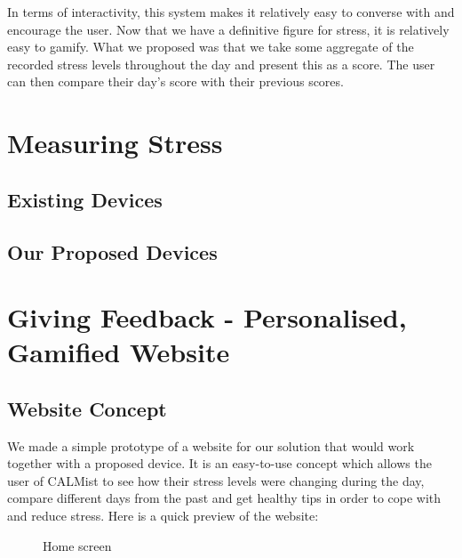\documentclass{scrartcl}
\begin{document}
In terms of interactivity, this system makes it relatively easy to converse with and encourage the user. Now that we have
a definitive figure for stress, it is relatively easy to gamify. What we proposed was that we take some aggregate of the
recorded stress levels throughout the day and present this as a score. The user can then compare their day's score with their
previous scores.


\section{Measuring Stress}
\subsection{Existing Devices}
\subsection{Our Proposed Devices}

\section{Giving Feedback - Personalised, Gamified Website}

\subsection{Website Concept}

We made a simple prototype of a website for our solution that would work together with a proposed device. It is an easy-to-use concept which allows the user of CALMist to see how their stress levels were changing during the day, compare different days from the past and get healthy tips in order to cope with and reduce stress. Here is a quick preview of the website:

\begin{figure}[htb]
	\begin{center}
			\end{center}
	\caption{Home screen}
	\label{fig:website-index}
\end{figure}
\end{document}
